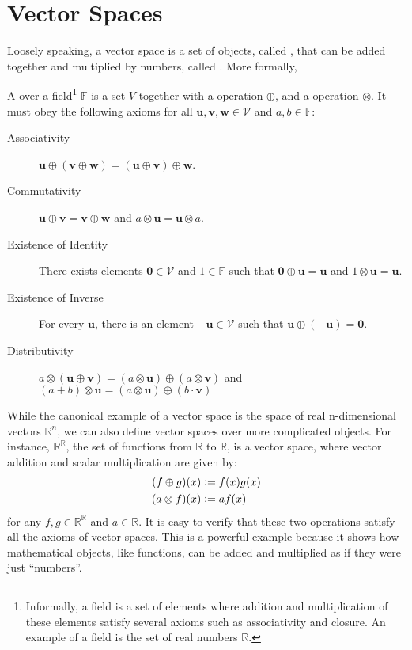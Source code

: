 \section{Vector Spaces}
Loosely speaking, a vector space is a set of objects, called , that can be added together and multiplied by numbers, called . More formally,
%
\begin{definition}
A  over a field\footnote{Informally, a field is a set of elements where addition and multiplication of these elements satisfy several axioms such as associativity and closure. An example of a field is the set of real numbers $\mathbb{R}$.} $\mathbb{F}$ is a set $V$ together with a  operation $\oplus$, and a  operation $\otimes$. It must obey the following axioms for all $\mathbf{u}, \mathbf{v}, \mathbf{w} \in \mathcal{V}$ and $a, b \in \mathbb{F}$:
%
\begin{description}
  \item[Associativity] $\mathbf{u} \oplus (\mathbf{v} \oplus \mathbf{w}) = (\mathbf{u} \oplus \mathbf{v}) \oplus \mathbf{w}$.
  \item[Commutativity] $\mathbf{u} \oplus \mathbf{v} = \mathbf{v} \oplus \mathbf{w}$ and $a \otimes \mathbf{u} = \mathbf{u} \otimes a$.
  \item[Existence of Identity] There exists elements $\mathbf{0} \in \mathcal{V}$ and $1 \in \mathbb{F}$ such that $\mathbf{0} \oplus \mathbf{u} = \mathbf{u}$ and $1 \otimes \mathbf{u} = \mathbf{u}$.
  \item[Existence of Inverse] For every $\mathbf{u}$, there is an element $-\mathbf{u} \in \mathcal{V}$ such that $\mathbf{u} \oplus (-\mathbf{u}) = \mathbf{0}$.
  \item[Distributivity] $a \otimes (\mathbf{u} \oplus \mathbf{v}) = (a \otimes \mathbf{u}) \oplus (a \otimes \mathbf{v})$ and $(a + b) \otimes \mathbf{u} = (a \otimes \mathbf{u}) \oplus (b \cdot \mathbf{v})$
\end{description}
\end{definition}
%
While the canonical example of a vector space is the space of real n-dimensional vectors $\mathbb{R}^n$, we can also define vector spaces over more complicated objects. For instance, $\mathbb{R}^\mathbb{R}$, the set of functions from $\mathbb{R}$ to $\mathbb{R}$, is a vector space, where vector addition and scalar multiplication are given by:
%
\begin{align}
  (f \oplus g)(x) &\vcentcolon= f(x) g(x) \\
  (a \otimes f)(x) &\vcentcolon= a f(x)
\end{align}
%
for any $f, g \in \mathbb{R}^\mathbb{R}$ and $a \in \mathbb{R}$. It is easy to verify that these two operations satisfy all the axioms of vector spaces. This is a powerful example because it shows how mathematical objects, like functions, can be added and multiplied as if they were just ``numbers''.


